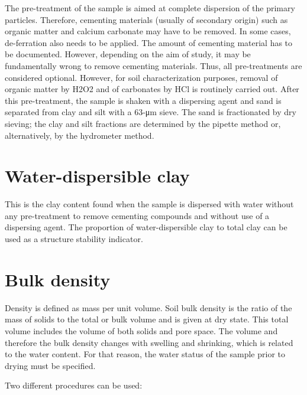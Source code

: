 \documentclass[
  letterpaper,
  DIV=11,
  numbers=noendperiod]{scrreprt}
\begin{document}
The pre-treatment of the sample is aimed at complete dispersion of the
primary particles. Therefore, cementing materials (usually of secondary
origin) such as organic matter and calcium carbonate may have to be
removed. In some cases, de-ferration also needs to be applied. The
amount of cementing material has to be documented. However, depending on
the aim of study, it may be fundamentally wrong to remove cementing
materials. Thus, all pre-treatments are considered optional. However,
for soil characterization purposes, removal of organic matter by H2O2
and of carbonates by HCl is routinely carried out. After this
pre-treatment, the sample is shaken with a dispersing agent and sand is
separated from clay and silt with a 63-μm sieve. The sand is
fractionated by dry sieving; the clay and silt fractions are determined
by the pipette method or, alternatively, by the hydrometer method.

\hypertarget{water-dispersible-clay}{%
\section{Water-dispersible clay}\label{water-dispersible-clay}}

This is the clay content found when the sample is dispersed with water
without any pre-treatment to remove cementing compounds and without use
of a dispersing agent. The proportion of water-dispersible clay to total
clay can be used as a structure stability indicator.

\hypertarget{bulk-density}{%
\section{Bulk density}\label{bulk-density}}

Density is defined as mass per unit volume. Soil bulk density is the
ratio of the mass of solids to the total or bulk volume and is given at
dry state. This total volume includes the volume of both solids and pore
space. The volume and therefore the bulk density changes with swelling
and shrinking, which is related to the water content. For that reason,
the water status of the sample prior to drying must be specified.

Two different procedures can be used:
\end{document}

